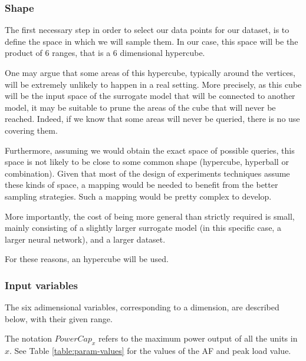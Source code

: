 \subsubsection{Shape}

The first necessary step in order to select our data points for our dataset, is to define the space in which we will sample them. In our case, this space will be the product of 6 ranges, that is a 6 dimensional hypercube. 

One may argue that some areas of this hypercube, typically around the vertices, will be extremely unlikely to happen in a real setting. More precisely, as this cube will be the input space of the surrogate model that will be connected to another model, it may be suitable to prune the areas of the cube that will never be reached. Indeed, if we know that some areas will never be queried, there is no use covering them.

Furthermore, assuming we would obtain the exact space of possible queries, this space is not likely to be close to some common shape (hypercube, hyperball or combination). Given that most of the design of experiments techniques assume these kinds of space, a mapping would be needed to benefit from the better sampling strategies. Such a mapping would be pretty complex to develop.

More importantly, the cost of being more general than strictly required is small, mainly consisting of a slightly larger surrogate model (in this specific case, a larger neural network), and a larger dataset.

For these reasons, an hypercube will be used.

\subsubsection{Input variables}

The six adimensional variables, corresponding to a dimension, are described below, with their given range.

The notation $PowerCap_{x}$ refers to the maximum power output of all the units in $x$. See Table \ref{table:param-values} for the values of the AF and peak load value.

